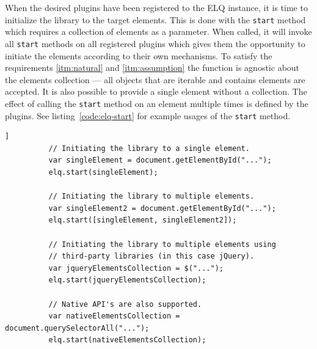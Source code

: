 \documentclass[a4paper,11pt]{kth-mag}
\newcommand{\code}[1]{\texttt{#1}}
\begin{document}
        When the desired plugins have been registered to the \gls{ELQ} instance, it is time to initialize the library to the target \glspl{element}.
        This is done with the \code{start} method which requires a collection of \glspl{element} as a parameter.
        When called, it will invoke all \code{start} methods on all registered plugins which gives them the opportunity to initiate the \glspl{element} according to their own mechanisms.
        To satisfy the requirements \ref{itm:natural} and \ref{itm:assumption} the function is agnostic about the \glspl{element} collection --- all objects that are iterable and contains \glspl{element} are accepted.
        It is also possible to provide a single \gls{element} without a collection.
        The effect of calling the \code{start} method on an element multiple times is defined by the plugins.
        See listing~\ref{code:elq-start} for example usages of the \code{start} method.
        \begin{lstlisting}[gobble=10,caption={Example usages of the \code{start} method. The method only requires an iterable collection, so it is library agnostic.},captionpos=b,label={code:elq-start}]]
          // Initiating the library to a single element.
          var singleElement = document.getElementById("...");
          elq.start(singleElement);

          // Initiating the library to multiple elements.
          var singleElement2 = document.getElementById("...");
          elq.start([singleElement, singleElement2]);

          // Initiating the library to multiple elements using
          // third-party libraries (in this case jQuery).
          var jqueryElementsCollection = $("...");
          elq.start(jqueryElementsCollection);

          // Native API's are also supported.
          var nativeElementsCollection = document.querySelectorAll("...");
          elq.start(nativeElementsCollection);
        \end{lstlisting}

\end{document}
